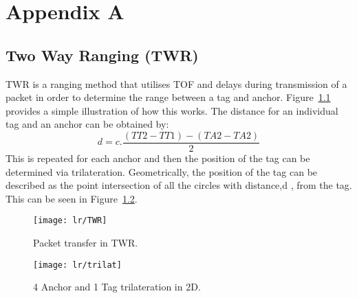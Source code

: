 %
%

\chapter{Appendix A}\label{app:app01}
\section*{Two Way Ranging (TWR)} %
TWR is a ranging method that utilises TOF and delays during transmission of a packet in order to determine the range between a tag and anchor.
Figure~\ref{fig:twr} provides a simple illustration of how this works.
The distance for an individual tag and an anchor can be obtained by:
\[
    d=c.\frac{(TT2-TT1)-(TA2-TA2)}{2}
\]
This is repeated for each anchor and then the position of the tag can be determined via trilateration.
Geometrically, the position of the tag can be described as the point intersection of all the circles with distance,d , from the tag.
This can be seen in Figure~\ref{fig:trilat}.
\begin{figure}[h!]
    \centering
    \texttt{[image: lr/TWR]}
    \caption{Packet transfer in TWR.}
    \label{fig:twr}
\end{figure}

\begin{figure}[h!]
    \centering
    \texttt{[image: lr/trilat]}
    \caption{4 Anchor and 1 Tag trilateration in 2D.}
    \label{fig:trilat}
\end{figure}
\newpage

